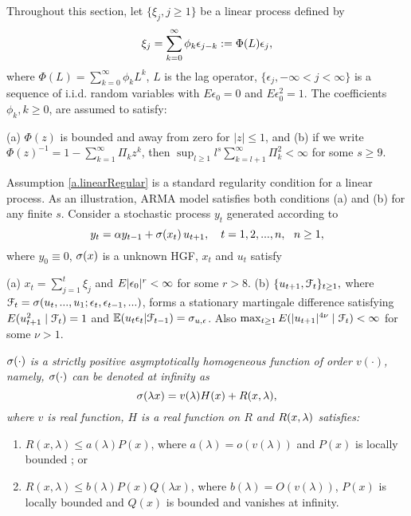 Throughout this section, let $\{\xi_{j},j\geq 1\}$ be a linear process defined by
 $$\xi_j=\sum_{k=0}^{\infty}\phi_k\epsilon_{j-k}:= \Phi(L)\epsilon_j,$$
 where $\Phi(L) = \sum_{k = 0}^{\infty} \phi_k L^k$, $L$ is the lag operator,
 $\{\epsilon _{j},-\infty <j<\infty \}$ is a sequence of i.i.d.
random variables with $E\epsilon _{0}=0$ and $E\epsilon _{0}^{2}=1$. The coefficients $%
\phi _{k},k\geq 0$, are assumed to satisfy:
\begin{assump}
(a) $\Phi(z)$ is bounded and away from zero for $|z| \le 1$, and
(b) if we write $\Phi(z)^{-1} = 1 - \sum_{k = 1}^{\infty} \Pi_k z^k$, then $\sup_{l\ge 1}l^s \sum_{k = l+1}^{\infty} \Pi_k^2 < \infty$ for some $s \ge 9$.
\end{assump}
Assumption \ref{a.linearRegular} is  a standard regularity condition for a linear process. As an illustration,  ARMA model satisfies both conditions (a) and (b) for any finite $s$. Consider a stochastic process  $y_{t}$  generated according to
\begin{equation} \la{eqn41}
y_{t}=\al y_{t-1}+\si(x_{t})\,u_{t+1}, \quad t=1,2,...,n,\ \ n\ge 1,
\end{equation}
where $y_{0}\equiv 0$, $\sigma(x)$ is a unknown HGF, $x_t$ and $u_t$ satisfy
 \begin{assump}  (a) $x_t=\sum_{j=1}^t\xi_j$ and $E|\epsilon_0|^r<\infty$ for some $r>8$. (b) $\{u_{t+1}, {\cal F}_t\}_{t\ge 1},$ where ${\cal F}_t=\sigma(u_{t},..., u_1; \epsilon_t,\epsilon_{t-1},... )$, forms a stationary martingale difference satisfying $E(u_{t+1}^2\mid {\cal F}_t)=1$ and $\mathbb E(u_t\epsilon_t | \mathcal F_{t -1}) = \sigma_{u, \epsilon}$. Also $\max_{t\ge 1}E(|u_{t+1}|^{4\nu}\mid {\cal F}_t)<\infty$ for some $\nu>1$.
\end{assump}

\begin{assump}  {\it  $\sigma(\cdot)$ is a strictly positive asymptotically homogeneous function of order $v(\cdot)$,
namely, $\sigma(\cdot)$ can be denoted at infinity as
\begin{equation}
\sigma(\lambda x) = v(\lambda)H(x) + R(x,\lambda),
\end{equation}
where $v$ is real function, $H$ is a real function on $R$ and $R(x, \lambda)$ satisfies:
\begin{enumerate}
\item $R(x,\lambda) \le a(\lambda)P(x)$, where $a(\lambda) = o( v(\lambda) )$ and $P(x)$ is locally bounded ; or
\item $R(x, \lambda) \le b(\lambda)P(x)Q(\lambda x)$, where $b(\lambda) = O(v(\lambda))$, $P(x)$ is locally bounded and $Q(x)$ is bounded and vanishes at infinity.
\end{enumerate}
}
\end{assump}


